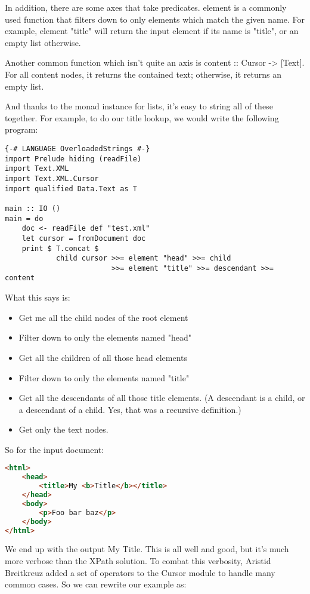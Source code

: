 In addition, there are some axes that take predicates. element is a commonly used function that filters down to only elements which match the given name. For example, element "title" will return the input element if its name is "title", or an empty list otherwise.

Another common function which isn't quite an axis is content :: Cursor -> [Text]. For all content nodes, it returns the contained text; otherwise, it returns an
empty list.

And thanks to the monad instance for lists, it's easy to string all of these together. For example, to do our title lookup, we would write the following program:

\begin{lstlisting}
{-# LANGUAGE OverloadedStrings #-}
import Prelude hiding (readFile)
import Text.XML
import Text.XML.Cursor
import qualified Data.Text as T

main :: IO ()
main = do
    doc <- readFile def "test.xml"
    let cursor = fromDocument doc
    print $ T.concat $
            child cursor >>= element "head" >>= child
                         >>= element "title" >>= descendant >>= content
\end{lstlisting}

What this says is:

\begin{itemize}
\item Get me all the child nodes of the root element
\item Filter down to only the elements named "head"
\item Get all the children of all those head elements
\item Filter down to only the elements named "title"
\item Get all the descendants of all those title elements. (A descendant is a child, or a descendant of a child. Yes, that was a recursive definition.)
\item Get only the text nodes.
\end{itemize}

So for the input document:

\begin{lstlisting}[language=HTML]
  <html>
    <head>
        <title>My <b>Title</b></title>
    </head>
    <body>
        <p>Foo bar baz</p>
    </body>
</html>
\end{lstlisting}

We end up with the output My Title. This is all well and good, but it's much more verbose than the XPath solution. To combat this verbosity, Aristid Breitkreuz added a set of operators to the Cursor module to handle many common cases. So we can rewrite our example as:

